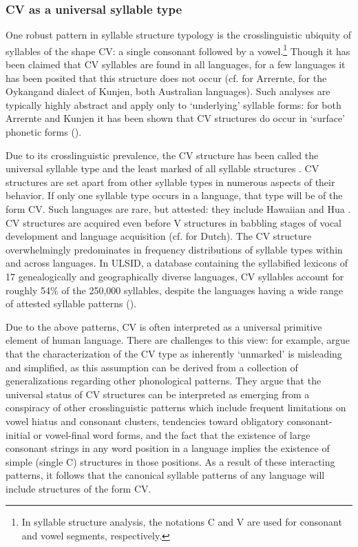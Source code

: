 \subsubsection{{CV} {as} {a} {universal} {syllable} {type}}\label{sec:1.1.2.1}

 One robust pattern in syllable structure typology is the crosslinguistic ubiquity of syllables of the shape CV: a single consonant followed by a vowel.\footnote{{In syllable structure analysis, the notations C and V are used for consonant and vowel segments, respectively.}} Though it has been claimed that CV syllables are found in all languages, for a few languages it has been posited that this structure does not occur (cf. \citealt{BreenPensalfini1999} for Arrernte, \citealt{Sommer1969} for the Oykangand dialect of Kunjen, both Australian languages). Such analyses are typically highly abstract and apply only to ‘underlying’ syllable forms: for both Arrernte and Kunjen it has been shown that CV structures do occur in ‘surface’ phonetic forms (\citealt{Anderson2000,Sommer1969,Sommer1981}).

  Due to its crosslinguistic prevalence, the CV structure has been called the universal syllable type and the least marked of all syllable structures \citep{Zec2007}. CV structures are set apart from other syllable types in numerous aspects of their behavior. If only one syllable type occurs in a language, that type will be of the form CV. Such languages are rare, but attested: they include Hawaiian \citep{Maddieson2011} and Hua \citep{Blevins1995}. CV structures are acquired even before V structures in babbling stages of vocal development and language acquisition (cf. \citealt{LeveltEtAl2000} for Dutch). The CV structure overwhelmingly predominates in frequency distributions of syllable types within and across languages. In ULSID, a database containing the syllabified lexicons of 17 genealogically and geographically diverse languages, CV syllables account for roughly 54\% of the 250,000 syllables, despite the languages having a wide range of attested syllable patterns (\citealt{ValléeEtAl2009}).

  Due to the above patterns, CV is often interpreted as a universal primitive element of human language. There are challenges to this view: for example, \citet{BellHooper1978} argue that the characterization of the CV type as inherently ‘unmarked’ is misleading and simplified, as this assumption can be derived from a collection of generalizations regarding other phonological patterns. They argue that the universal status of CV structures can be interpreted as emerging from a conspiracy of other crosslinguistic patterns which include frequent limitations on vowel hiatus and consonant clusters, tendencies toward obligatory consonant-initial or vowel-final word forms, and the fact that the existence of large consonant strings in any word position in a language implies the existence of simple (single C) structures in those positions. As a result of these interacting patterns, it follows that the canonical syllable patterns of any language will include structures of the form CV.

